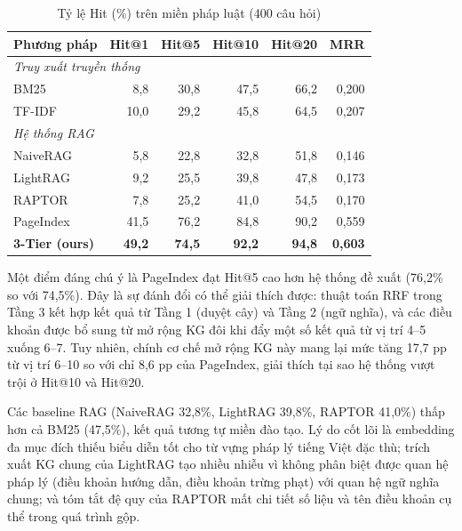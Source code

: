 \begin{table}[htbp]
  \centering
  \caption{Tỷ lệ Hit (\%) trên miền pháp luật (400 câu hỏi)}
  \label{tab:hit-phapluat}
  \begin{tabular}{lrrrrr}
    \toprule
    \textbf{Phương pháp} & \textbf{Hit@1} & \textbf{Hit@5} & \textbf{Hit@10} & \textbf{Hit@20} & \textbf{MRR} \\
    \midrule
    \multicolumn{6}{l}{\textit{Truy xuất truyền thống}} \\
    BM25            & 8{,}8  & 30{,}8 & 47{,}5 & 66{,}2 & 0{,}200 \\
    TF-IDF          & 10{,}0 & 29{,}2 & 45{,}8 & 64{,}5 & 0{,}207 \\
    \multicolumn{6}{l}{\textit{Hệ thống RAG}} \\
    NaiveRAG~\cite{reimers2019sbert}   & 5{,}8  & 22{,}8 & 32{,}8 & 51{,}8 & 0{,}146 \\
    LightRAG~\cite{guo2025lightrag}           & 9{,}2  & 25{,}5 & 39{,}8 & 47{,}8 & 0{,}173 \\
    RAPTOR~\cite{sarthi2024raptor}            & 7{,}8  & 25{,}2 & 41{,}0 & 54{,}5 & 0{,}170 \\
    PageIndex~\cite{zhang2025pageindex}       & 41{,}5 & 76{,}2 & 84{,}8 & 90{,}2 & 0{,}559 \\
    \textbf{3-Tier (ours)} & \textbf{49{,}2} & \textbf{74{,}5} & \textbf{92{,}2} & \textbf{94{,}8} & \textbf{0{,}603} \\
    \bottomrule
  \end{tabular}
\end{table}

Một điểm đáng chú ý là PageIndex đạt Hit@5 cao hơn hệ thống đề xuất (76,2\% so
với 74,5\%). Đây là sự đánh đổi có thể giải thích được: thuật toán RRF trong Tầng 3 kết
hợp kết quả từ Tầng 1 (duyệt cây) và Tầng 2 (ngữ nghĩa), và các điều khoản được bổ
sung từ mở rộng KG đôi khi đẩy một số kết quả từ vị trí 4--5 xuống 6--7. Tuy nhiên,
chính cơ chế mở rộng KG này mang lại mức tăng 17,7 pp từ vị trí 6--10 so với chỉ 8,6
pp của PageIndex, giải thích tại sao hệ thống vượt trội ở Hit@10 và Hit@20.

Các baseline RAG (NaiveRAG 32,8\%, LightRAG 39,8\%, RAPTOR 41,0\%) thấp
hơn cả BM25 (47,5\%), kết quả tương tự miền đào tạo. Lý do cốt lõi là embedding đa
mục đích thiếu biểu diễn tốt cho từ vựng pháp lý tiếng Việt đặc thù; trích xuất KG
chung của LightRAG tạo nhiều nhiễu vì không phân biệt được quan hệ pháp lý (điều
khoản hướng dẫn, điều khoản trừng phạt) với quan hệ ngữ nghĩa chung; và tóm tắt
đệ quy của RAPTOR mất chi tiết số liệu và tên điều khoản cụ thể trong quá trình gộp.


